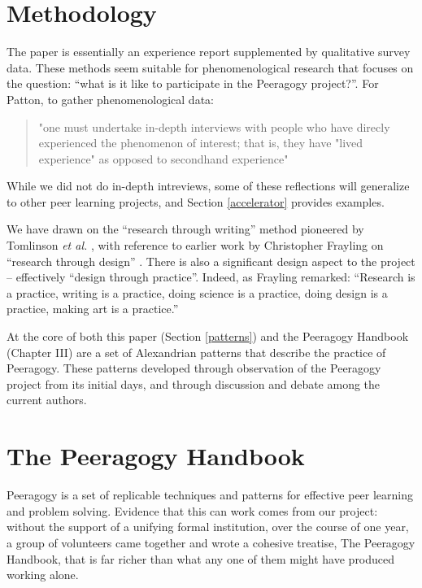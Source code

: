 \documentclass{acm_proc_article-sp}
\begin{document}
\section{Methodology}

The paper is essentially an experience report supplemented by qualitative survey data. These methods seem suitable for phenomenological research that focuses on the question: ``what is it like to participate in the Peeragogy project?''. For Patton\cite{patton}, to gather phenomenological data: 
\begin{quote}
"one must undertake in-depth interviews with people who have direcly experienced the phenomenon of interest; that is, they have "lived experience" as opposed to secondhand experience"
\end{quote}

While we did not do in-depth intreviews, some of these reflections will generalize to other peer learning projects, and Section \ref{accelerator} provides examples.

We have drawn on the ``research through writing'' method pioneered by Tomlinson \emph{et al.} \cite{tomlinson2012massively}, with reference to earlier work by Christopher Frayling on ``research through design'' \cite{frayling1993research}. There is also a significant design aspect to the project -- effectively ``design through practice''. Indeed, as Frayling remarked: ``Research is a practice, writing is a practice, doing science is a practice, doing design is a practice, making art is a practice.''

At the core of both this paper (Section \ref{patterns}) and the Peeragogy Handbook (Chapter III) are a set of Alexandrian patterns that describe the practice of Peeragogy. These patterns developed through observation of the Peeragogy project from its initial days, and through discussion and debate among the current authors.

\section{The Peeragogy Handbook}

Peeragogy is a set of replicable techniques and patterns for effective
peer learning and problem solving.  Evidence that this can work comes
from our project: without the support of a unifying formal
institution, over the course of one year, a group of volunteers came
together and wrote a cohesive treatise, The Peeragogy Handbook, that is far richer
than what any one of them might have produced working alone.
\end{document}
